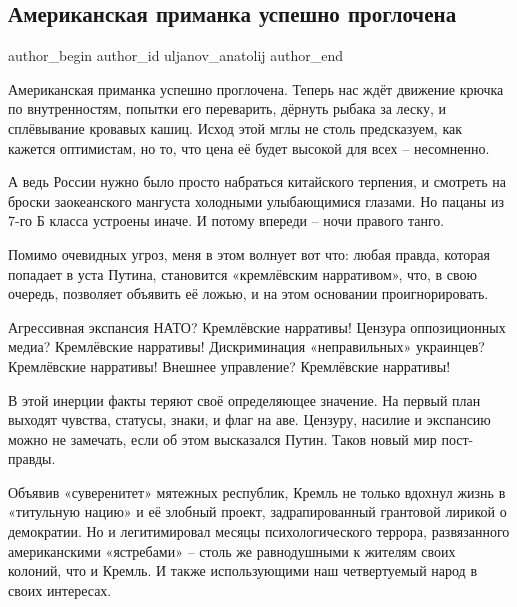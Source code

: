  
 
 
 
 
 
\subsection{Американская приманка успешно проглочена}
\label{sec:23_02_2022.fb.uljanov_anatolij.1.amerikanskaja_primanka}
 
\ifcmt
 author_begin
   author_id uljanov_anatolij
 author_end
\fi

Американская приманка успешно проглочена. Теперь нас ждёт движение крючка по
внутренностям, попытки его переварить, дёрнуть рыбака за леску, и сплёвывание
кровавых кашиц. Исход этой мглы не столь предсказуем, как кажется оптимистам,
но то, что цена её будет высокой для всех – несомненно. 


А ведь России нужно было просто набраться китайского терпения, и смотреть на
броски заокеанского мангуста холодными улыбающимися глазами. Но пацаны из 7-го
Б класса устроены иначе. И потому впереди – ночи правого танго.

Помимо очевидных угроз, меня в этом волнует вот что: любая правда, которая
попадает в уста Путина, становится «кремлёвским нарративом», что, в свою
очередь, позволяет объявить её ложью, и на этом основании проигнорировать.

Агрессивная экспансия НАТО? Кремлёвские нарративы! Цензура оппозиционных медиа?
Кремлёвские нарративы! Дискриминация «неправильных» украинцев? Кремлёвские
нарративы! Внешнее управление? Кремлёвские нарративы!

В этой инерции факты теряют своё определяющее значение. На первый план выходят
чувства, статусы, знаки, и флаг на аве. Цензуру, насилие и экспансию можно не
замечать, если об этом высказался Путин. Таков новый мир пост-правды.

Объявив «суверенитет» мятежных республик, Кремль не только вдохнул жизнь в
«титульную нацию» и её злобный проект, задрапированный грантовой лирикой о
демократии. Но и легитимировал месяцы психологического террора, развязанного
американскими «ястребами» – столь же равнодушными к жителям своих колоний, что
и Кремль. И также использующими наш четвертуемый народ в своих интересах. 


